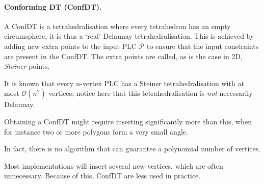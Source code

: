 \paragraph*{Conforming DT (ConfDT).}

A ConfDT is a tetrahedralisation where every tetrahedron has an empty circumsphere, it is thus a `real' Delaunay tetrahedralisation.   
This is achieved by adding new extra points to the input PLC $\mathcal{P}$ to ensure that the input constraints are present in the ConfDT\@. 
The extra points are called, as is the case in 2D, \emph{Steiner} points.

% 

It is known that every $n$-vertex PLC has a Steiner tetrahedralisation with at most $\mathcal{O}(n^2)$ vertices; notice here that this tetrahedralisation is \emph{not} necessarily Delaunay.

Obtaining a ConfDT might require inserting significantly more than this, when for instance two or more polygons form a very small angle.

In fact, there is no algorithm that can guarantee a polynomial number of vertices.

Most implementations will insert several new vertices, which are often unnecessary.
Because of this, ConfDT are less used in practice.






